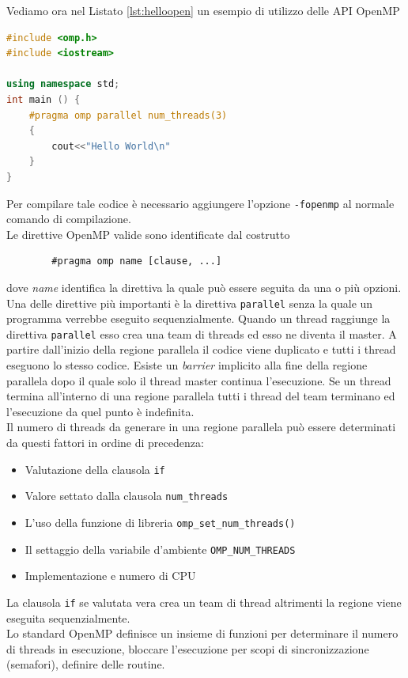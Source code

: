 Vediamo ora nel Listato \ref{lst:helloopen} un esempio di utilizzo delle API OpenMP
\begin{lstlisting}[language=C++,caption={Esempio di utilizzo delle OpenMP},label=lst:helloopen]
#include <omp.h>
#include <iostream>

using namespace std;
int main () {
	#pragma omp parallel num_threads(3)
	{
		cout<<"Hello World\n"
	}	
}
\end{lstlisting}
Per compilare tale codice è necessario aggiungere l'opzione \texttt{-fopenmp} al normale comando di compilazione.\\
Le direttive OpenMP valide sono identificate dal costrutto
\begin{verbatim}
		#pragma omp name [clause, ...]
\end{verbatim}
dove \emph{name} identifica la direttiva la quale può essere seguita da una o più opzioni. Una delle direttive più importanti è la direttiva \texttt{parallel} senza la quale un programma verrebbe eseguito sequenzialmente. Quando un thread raggiunge la direttiva \texttt{parallel} esso crea una team di  threads ed esso ne diventa il master. A partire dall'inizio della regione parallela il codice viene duplicato e tutti i thread eseguono lo stesso codice. Esiste un \emph{barrier} implicito alla fine della regione parallela dopo il quale solo il thread master continua l'esecuzione.
Se un thread termina all'interno di una regione parallela tutti i thread del team terminano ed l'esecuzione da quel punto è indefinita.\\
Il numero di threads da generare in una regione parallela può essere determinati da questi fattori in ordine di precedenza:
\begin{itemize}	
	\item Valutazione della clausola \texttt{if}
	\item Valore settato dalla clausola \texttt{num\_threads}
	\item L'uso della funzione di libreria \texttt{omp\_set\_num\_threads()}
	\item Il settaggio della variabile d'ambiente \texttt{OMP\_NUM\_THREADS}
	\item Implementazione e numero di CPU
\end{itemize}
La clausola \texttt{if} se valutata vera crea un team di thread altrimenti la regione viene eseguita sequenzialmente.\\
Lo standard OpenMP definisce un insieme di funzioni per determinare il numero di threads in esecuzione, bloccare l'esecuzione per scopi di sincronizzazione (semafori), definire delle routine.
